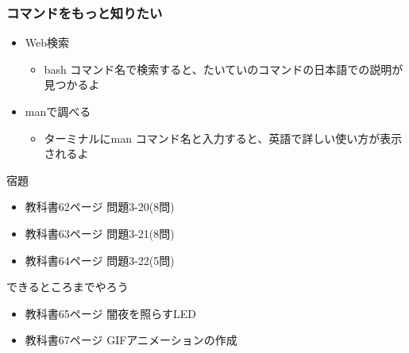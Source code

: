 \documentclass[slide03.tex]{subfiles}
\begin{document}
\begin{frame}
    \frametitle{コマンドをもっと知りたい}
    \begin{itemize}
        \item Web検索
        \begin{itemize}
            \item bash コマンド名で検索すると、たいていのコマンドの日本語での説明が見つかるよ
        \end{itemize}
        \item manで調べる
        \begin{itemize}
            \item ターミナルにman コマンド名と入力すると、英語で詳しい使い方が表示されるよ
        \end{itemize}
    \end{itemize}
\end{frame}

\begin{frame}
    \begin{exampleblock}{宿題}
        \begin{itemize}
            \item 教科書62ページ 問題3-20(8問)
            \item 教科書63ページ 問題3-21(8問)
            \item 教科書64ページ 問題3-22(5問)
            \end{itemize}
    \end{exampleblock}
    \begin{block}{できるところまでやろう}
        \begin{itemize}
            \item 教科書65ページ 闇夜を照らすLED
            \item 教科書67ページ GIFアニメーションの作成
        \end{itemize}
    \end{block}
\end{frame}
\end{document}
